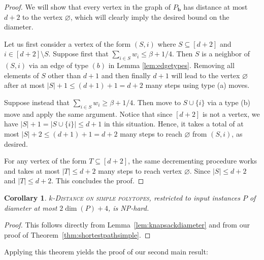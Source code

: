 \documentclass[centering,11pt,reqno]{amsart}
\newtheorem{cor}[theorem]{Corollary}
\theoremstyle{definition}
\renewcommand{\emptyset}{\varnothing}
\newcommand{\NP}{\textsc{NP}}
\begin{document}
\begin{proof}
We will show that every vertex in the graph of $P_\mathbf{b}$ has distance at most $d+2$ to the vertex $\emptyset$, which will clearly imply the desired bound on the diameter.

Let us first consider a vertex of the form $(S,i)$ where $S\subseteq [d+2]$ and $i\in [d+2]\setminus S$. Suppose first that $\sum_{i \in S} w_{i} \leq \beta + 1/4$. Then $S$ is a neighbor of $(S,i)$ via an edge of type $(b)$ in Lemma \ref{lem:edgetypes}. Removing all elements of $S$ other than $d+1$ and then finally $d+1$ will lead to the vertex $\emptyset$ after at most $|S| + 1\le (d+1)+1=d+2$ many steps using type (a) moves.

Suppose instead that $\sum_{i \in S} w_{i} \geq \beta + 1/4$. Then move to $S \cup \{i\}$ via a type (b) move and apply the same argument. Notice that since $[d+2]$ is not a vertex, we have $|S|+1=|S\cup \{i\}|\le d+1$ in this situation. Hence, it takes a total of at most $|S| + 2\le (d+1)+1=d+2$ many steps to reach $\emptyset$ from $(S,i)$, as desired. 

For any vertex of the form $T\subseteq [d+2]$, the same decrementing procedure works and takes at most $|T|\le d+2$ many steps to reach vertex $\emptyset$. Since $|S| \leq d+2$ and $|T| \leq d+2$. This concludes the proof.
\end{proof}

\begin{cor}\label{cor:obvious}
    \textsc{$k$-Distance on simple polytopes}, restricted to input instances $P$ of diameter at most $2\dim(P)+4$, is \NP-hard.
\end{cor}
\begin{proof}
    This follows directly from Lemma~\ref{lem:knapsackdiameter} and from our proof of Theorem~\ref{thm:shortestpathsimple}.
\end{proof}

Applying this theorem yields the proof of our second main result:
\end{document}
